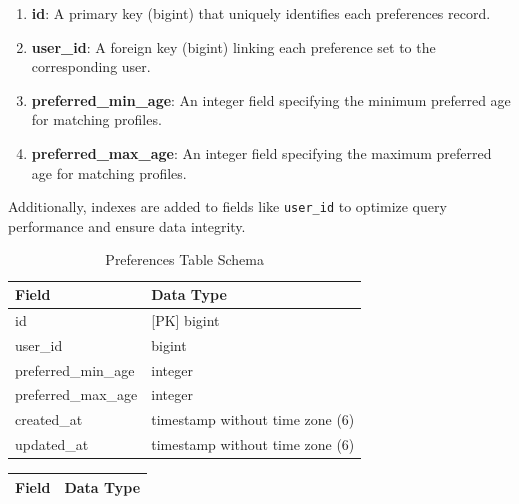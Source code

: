 \begin{enumerate}
        \begin{enumerate}
            \item \textbf{id}: A primary key (bigint) that uniquely identifies each preferences record.
            \item \textbf{user\_id}: A foreign key (bigint) linking each preference set to the corresponding user.
            \item \textbf{preferred\_min\_age}: An integer field specifying the minimum preferred age for matching profiles.
            \item \textbf{preferred\_max\_age}: An integer field specifying the maximum preferred age for matching profiles.
        \end{enumerate}

\bigskip Additionally, indexes are added to fields like \texttt{user\_id} to optimize query performance and ensure data integrity.
    \begin{table}[h!]
    \captionsetup{justification=centering, singlelinecheck=false, labelsep=space}
    \centering
    \begin{tabular}{ll} %
    \hline
    \textbf{Field}               & \textbf{Data Type}                 \\ \hline
    id                           & [PK] bigint                        \\ 
    user\_id                     & bigint                             \\ 
    preferred\_min\_age          & integer                            \\ 
    preferred\_max\_age          & integer                            \\ 
    created\_at                  & timestamp without time zone (6)    \\ 
    updated\_at                  & timestamp without time zone (6)    \\ \hline
    \end{tabular}
    \caption{Preferences Table Schema} %
    \label{tab:Preferences Table Schema}
    \end{table}
    \begin{table}[h!]
    \captionsetup{justification=centering, singlelinecheck=false, labelsep=space}
    \centering
    \begin{tabular}{ll}
    \hline
    \textbf{Field}               & \textbf{Data Type}                 \\ \hline

\end{tabular}
\end{table}
\end{enumerate}
